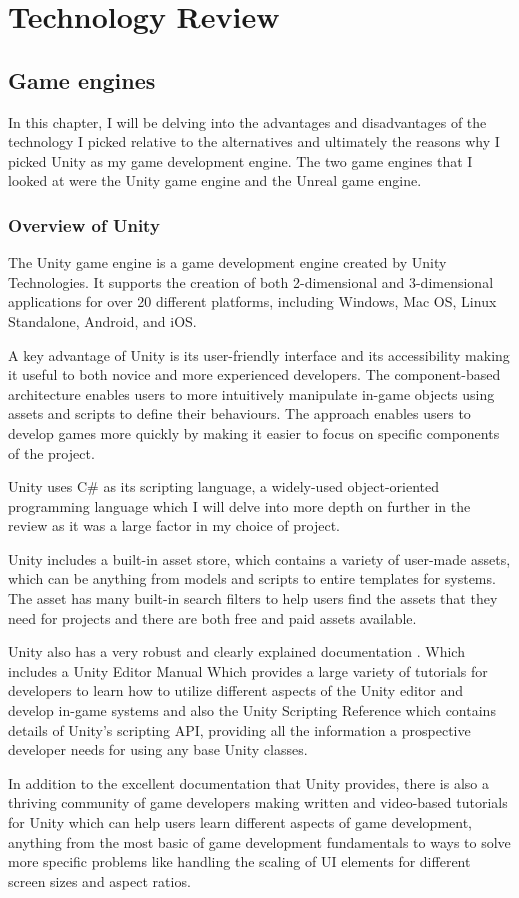 \chapter{Technology Review}
\section{Game engines}
In this chapter, I will be delving into the advantages and disadvantages of the technology I picked relative to the alternatives and ultimately the reasons why I picked Unity as my game development engine. The two game engines that I looked at were the Unity game engine and the Unreal game engine.
\subsection{Overview of Unity}
The Unity game engine is a game development engine created by Unity Technologies. It supports the creation of both 2-dimensional and 3-dimensional applications for over 20 different \cite{UnitySupportedPlatforms} platforms, including Windows, Mac OS, Linux Standalone, Android, and iOS. 
\par
A key advantage of Unity is its user-friendly interface and its accessibility making it useful to both novice and more experienced developers. The component-based architecture enables users to more intuitively manipulate in-game objects using assets and scripts to define their behaviours. The approach enables users to develop games more quickly by making it easier to focus on specific components of the project.
\par
Unity uses C\# as its scripting language, a widely-used object-oriented programming language which I will delve into more depth on further in the review as it was a large factor in my choice of project.
\par
Unity includes a built-in asset store, which contains a variety of user-made assets, which can be anything from models and scripts to entire templates for systems. The asset has many built-in search filters to help users find the assets that they need for projects and there are both free and paid assets available.
\par
Unity also has a very robust and clearly explained documentation \cite{UnityDocumentation}. Which includes a Unity Editor Manual Which provides a large variety of tutorials for developers to learn how to utilize different aspects of the Unity editor and develop in-game systems and also the Unity Scripting Reference which contains details of Unity's scripting API, providing all the information a prospective developer needs for using any base Unity classes.
\par
In addition to the excellent documentation that Unity provides, there is also a thriving community of game developers making written and video-based tutorials for Unity which can help users learn different aspects of game development, anything from the most basic of game development fundamentals to ways to solve more specific problems like handling the scaling of UI elements for different screen sizes and aspect ratios.
\par
